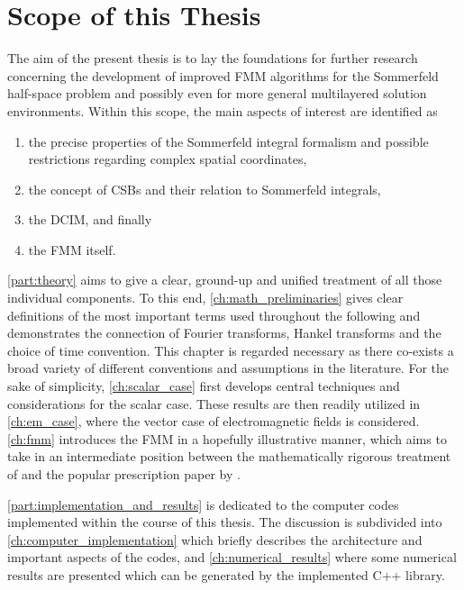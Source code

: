 \section{Scope of this Thesis}
\label{sec:scope_of_this_thesis}

The aim of the present thesis is to lay the foundations for further research
concerning the development of improved \ac{FMM} algorithms for the Sommerfeld
half-space problem and possibly even for more general multilayered solution
environments.
Within this scope, the main aspects of interest are identified as
\begin{enumerate}
	\item the precise properties of the Sommerfeld integral formalism and
	possible restrictions regarding complex spatial coordinates,
	\item the concept of \acp{CSB} and their relation to Sommerfeld integrals,
	\item the \ac{DCIM}, and finally 
	\item the \ac{FMM} itself.
\end{enumerate}

\cref{part:theory} aims to give a clear, ground-up and unified treatment of
all those individual components.
To this end, \cref{ch:math_preliminaries} gives clear definitions of the most
important terms used throughout the following and demonstrates the connection
of Fourier transforms, Hankel transforms and the choice of time convention.
This chapter is regarded necessary as there co-exists a broad variety of
different conventions and assumptions in the literature.
For the sake of simplicity, \cref{ch:scalar_case} first develops central
techniques and considerations for the scalar case.
These results are then readily utilized in \cref{ch:em_case}, where
the vector case of electromagnetic fields is considered.
\cref{ch:fmm} introduces the \ac{FMM} in a hopefully illustrative manner, which
aims to take in an intermediate position between the mathematically rigorous
treatment of \textcite{Rokhlin1993} and the popular prescription paper by
\textcite{Coifman1993}.

\cref{part:implementation_and_results} is dedicated to the computer codes 
implemented within the course of this thesis.
The discussion is subdivided into \cref{ch:computer_implementation} which
briefly describes the architecture and important aspects of the codes, and
\cref{ch:numerical_results} where some numerical results are presented which
can be generated by the implemented C++ library.

